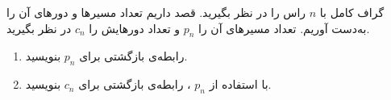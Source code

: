 \EXERCISE
گراف کامل با
$n$
راس را در نظر بگیرید. قصد داریم تعداد مسیرها و دورهای آن را به‌دست آوریم. تعداد مسیرهای آن را
$p_n$
و تعداد دورهایش را
$c_n$
در نظر بگیرید.
\begin{enumerate}
\item
رابطه‌ی بازگشتی برای
$p_n$
بنویسید.
\item
با استفاده از
$p_n$
، رابطه‌ی بازگشتی برای
$c_n$
بنویسید.
\end{enumerate}